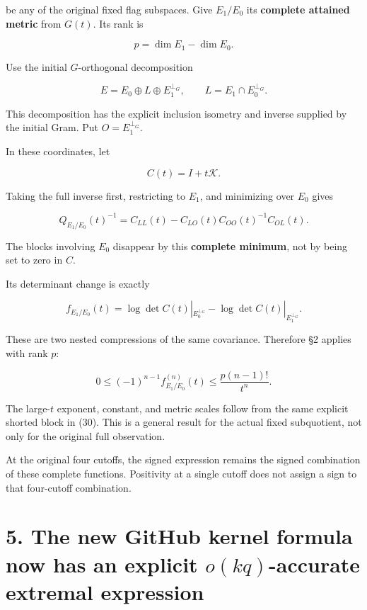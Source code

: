 be any of the original fixed flag subspaces. Give \(E_1/E_0\) its \textbf{complete attained metric} from \(G(t)\). Its rank is

\[
p=\dim E_1-\dim E_0.
\]

Use the initial \(G\)-orthogonal decomposition

\[
E=E_0\oplus L\oplus E_1^{\perp_G},
\qquad
L=E_1\cap E_0^{\perp_G}.
\]

This decomposition has the explicit inclusion isometry and inverse supplied by the initial Gram. Put \(O=E_1^{\perp_G}\).

In these coordinates, let

\[
C(t)=I+t\mathcal K.
\]

Taking the full inverse first, restricting to \(E_1\), and minimizing over \(E_0\) gives

\[
\boxed{
Q_{E_1/E_0}(t)^{-1}
=
C_{LL}(t)-C_{LO}(t)C_{OO}(t)^{-1}C_{OL}(t).
}
\tag{30}
\]

The blocks involving \(E_0\) disappear by this \textbf{complete minimum}, not by being set to zero in \(C\).

Its determinant change is exactly

\[
\boxed{
f_{E_1/E_0}(t)
=
\log\det C(t)|_{E_0^{\perp_G}}
-\log\det C(t)|_{E_1^{\perp_G}}.
}
\tag{31}
\]

These are two nested compressions of the same covariance. Therefore §2 applies with rank \(p\):

\[
\boxed{
0\le
(-1)^{n-1}f_{E_1/E_0}^{(n)}(t)
\le \frac{p(n-1)!}{t^n}.
}
\tag{32}
\]

The large-\(t\) exponent, constant, and metric scales follow from the same explicit shorted block in (30). This is a general result for the actual fixed subquotient, not only for the original full observation.

At the original four cutoffs, the signed expression remains the signed combination of these complete functions. Positivity at a single cutoff does not assign a sign to that four-cutoff combination.

\section{\texorpdfstring{5. The new GitHub kernel formula now has an explicit \(o(kq)\)-accurate extremal expression}{5. The new GitHub kernel formula now has an explicit o(kq)-accurate extremal expression}}\label{the-new-github-kernel-formula-now-has-an-explicit-okq-accurate-extremal-expression}

